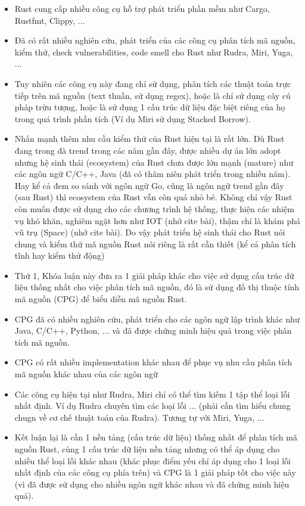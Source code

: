 \begin{itemize}
    \item Rust cung cấp nhiều công cụ hỗ trợ phát triển phần mềm như Cargo, Rustfmt, Clippy, ...
    \item Đã có rất nhiều nghiên cứu, phát triển của các công cụ phân tích mã nguồn, kiểm thử, check vulnerabilities, code smell cho Rust như Rudra, Miri, Yuga, ...
    \item Tuy nhiên các công cụ này đang chỉ sử dụng, phân tích các thuật toán trực tiếp trên mã nguồn (text thuần, sử dụng regex), hoặc là chỉ sử dụng cây cú pháp trừu tượng, hoặc là sử dụng 1 cấu trúc dữ liệu đặc biệt riêng của họ trong quá trình phần tích (Ví dụ Miri sử dụng Stacked Borrow).
    \item Nhấn mạnh thêm nhu cầu kiểm thử của Rust hiện tại là rất lớn. Dù Rust đang trong đà trend trong các năm gần đây, được nhiều dự án lớn adopt nhưng hệ sinh thái (ecosystem) của Rust chưa được lớn mạnh (mature) như các ngôn ngữ C/C++, Java (đã có thâm niên phát triển trong nhiều năm). Hay kể cả đem so sánh với ngôn ngữ Go, cũng là ngôn ngữ trend gần đây (sau Rust) thì ecosystem của Rust vẫn còn quá nhỏ bé. Không chỉ vậy Rust còn muốn được sử dụng cho các chương trình hệ thống, thực hiện các nhiệm vụ khó khăn, nghiêm ngặt hơn như IOT (nhớ cite bài), thậm chí là khám phá vũ trụ (Space) (nhớ cite bài). Do vậy phát triển hệ sinh thái cho Rust nói chung và kiểm thử mã nguồn Rust nói riêng là rất cần thiết (kể cả phân tích tĩnh hay kiểm thử động)
    \item Thứ 1, Khóa luận này đưa ra 1 giải pháp khác cho việc sử dụng cấu trúc dữ liệu thống nhất cho việc phân tích mã nguồn, đó là sử dụng đồ thị thuộc tính mã nguồn (CPG) để biểu diễn mã nguồn Rust.
    \item CPG đã có nhiều nghiên cứu, phát triển cho các ngôn ngữ lập trình khác như Java, C/C++, Python, ... và đã được chứng minh hiệu quả trong việc phân tích mã nguồn.
    \item CPG có rất nhiều implementation khác nhau để phục vụ nhu cầu phân tích mã nguồn khác nhau của các ngôn ngữ
    \item Các công cụ hiện tại như Rudra, Miri chỉ có thể tìm kiếm 1 tập thể loại lỗi nhất định. Ví dụ Rudra chuyên tìm các loại lỗi ... (phải cần tìm hiểu chung chugn về cơ chế thuật toán của Rudra). Tương tự với Miri, Yuga, ...
    \item Kết luận lại là cần 1 nền tảng (cấu trúc dữ liệu) thống nhất để phân tích mã nguồn Rust, cùng 1 cấu trúc dữ liệu nền tảng nhưng có thể áp dụng cho nhiều thể loại lỗi khác nhau (khác phục điểm yếu chỉ áp dụng cho 1 loại lỗi nhất định của các công cụ phía trên) và CPG là 1 giải pháp tốt cho việc này (vì đã được sử dụng cho nhiều ngôn ngữ khác nhau và đã chứng minh hiệu quả).

\end{itemize}
